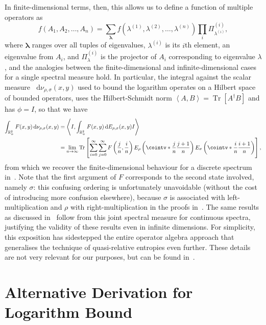 \documentclass[10pt, a4paper]{article}
\numberwithin{equation}{section} %
\theoremstyle{definition}
\theoremstyle{plain}
\newcommand{\dif}{\mathop{}\!\mathrm{d}} %
\newcommand{\?}{\mathrel{?}} %
\newcommand{\R}{\mathbb{R}} %
\newcommand{\cvec}[1]{\boldsymbol{\mathbf{#1}}}    %
\newcommand{\angleb}[1]{\left\langle #1 \right\rangle} %
\newcommand{\Tr}[2][]{\mathop{\mathrm{Tr}#1}\left[ #2 \right]} %
\begin{document}
\begin{appendices}
                    In finite-dimensional terms, then, this allows us to define a function of multiple operators as
                    \[f(A_1, A_2, \ldots, A_n) = \sum_{\cvec{\lambda}} f(\lambda^{(1)}, \lambda^{(2)}, \ldots, \lambda^{(n)}) \prod_i \Pi^{(i)}_{\lambda^{(i)}}, \]
                    where \(\cvec{\lambda}\) ranges over all tuples of eigenvalues, \(\lambda^{(i)}\) is its \(i\)th element, an eigenvalue from \(A_i\), and \(\Pi^{(i)}_{\lambda}\) is the projector of \(A_i\) corresponding to eigenvalue \(\lambda\), and the analogies between the finite-dimensional and infinite-dimensional cases for a single spectral measure hold. In particular, the integral against the scalar measure \(\dif{\nu_{\rho,\sigma}(x,y)}\) used to bound the logarithm operates on a Hilbert space of bounded operators, uses the Hilbert-Schmidt norm \(\angleb{A, B} = \Tr{A^{\dagger}B}\) and has \(\phi = I\), so that we have
                    \begin{align*}
                      \int_{\R_+^{2}} F(x,y) \dif{\nu_{\rho,\sigma}(x,y)} &= \angleb{I, \int_{\R_+^{2}} F(x,y) \dif{E_{\rho,\sigma}(x,y)} I} \\
                                                                          &= \lim_{n\to\infty} \Tr{ \sum_{i=0}^{\infty}\sum_{j=0}^{\infty} F\left(\frac{j}{n}, \frac{i}{n}\right) E_{\rho}\left(\cointv*{\frac{j}{n}}{\frac{j+1}{n}}\right)
                                                                          E_{\sigma}\left(\cointv*{\frac{i}{n}}{\frac{i+1}{n}}\right) },
                    \end{align*}
                    from which we recover the finite-dimensional behaviour for a discrete spectrum in~. Note that the first argument of \(F\) corresponds to the second state involved, namely \(\sigma\): this confusing ordering is unfortunately unavoidable (without the cost of introducing more confusion elsewhere), because \(\sigma\) is associated with left-multiplication and \(\rho\) with right-multiplication in the proofs in~\cite{BFF_QRE}. The same results as discussed in~ follow from this joint spectral measure for continuous spectra, justifying the validity of these results even in infinite dimensions. For simplicity, this exposition has sidestepped the entire operator algebra approach that generalises the technique of quasi-relative entropies even further. These details are not very relevant for our purposes, but can be found in~\cite{BFF_QRE}.

                    \section{Alternative Derivation for Logarithm Bound}\label{sec:logratbound}


\end{appendices}
\end{document}
